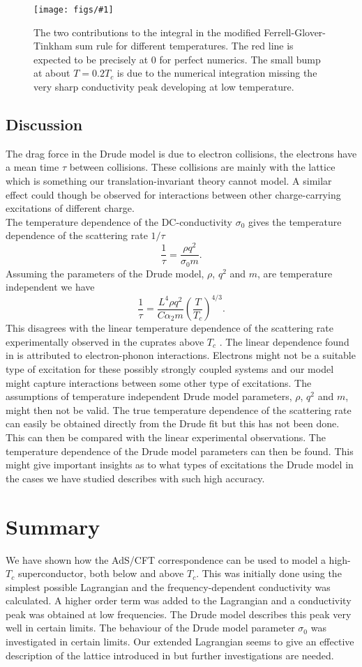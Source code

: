 \documentclass[12pt]{report}
\newcommand{\fig}[2]{
\begin{figure}
\centering
\texttt{[image: figs/\#1]}
\caption{#2}
\end{figure}
}
\begin{document}
\fig{sum_rule_a20.1}{The two contributions to the integral in the modified Ferrell-Glover-Tinkham sum rule for different temperatures. The red line is expected to be precisely at 0 for perfect numerics\label{f:sum2}. The small bump at about $T=0.2T_c$ is due to the numerical integration missing the very sharp conductivity peak developing at low temperature.}

\section{Discussion}
The drag force in the Drude model is due to electron collisions, the electrons have a mean time $\tau$ between collisions. These collisions are mainly with the lattice which is something our translation-invariant theory cannot model. A similar effect could though be observed for interactions between other charge-carrying excitations of different charge.\\
The temperature dependence of the DC-conductivity $\sigma_0$ gives the temperature dependence of the scattering rate $1/\tau$
\begin{equation}
  \frac{1}{\tau}=\frac{\rho q^2}{\sigma_0m}.
\end{equation}
Assuming the parameters of the Drude model, $\rho$, $q^2$ and $m$, are temperature independent we have
\begin{equation}
  \frac{1}{\tau}=\frac{L^4\rho q^2}{C\alpha_2m}\left(\frac{T}{T_c}\right)^{4/3}.
\end{equation}
This disagrees with the linear temperature dependence of the scattering rate experimentally observed in the cuprates above $T_c$ \cite{drudeFit}. The linear dependence found in \cite{drudeFit} is attributed to electron-phonon interactions. Electrons might not be a suitable type of excitation for these possibly strongly coupled systems and our model might capture interactions between some other type of excitations. The assumptions of temperature independent Drude model parameters, $\rho$, $q^2$ and $m$, might then not be valid. The true temperature dependence of the scattering rate can easily be obtained directly from the Drude fit but this has not been done. This can then be compared with the linear experimental observations. The temperature dependence of the Drude model parameters can then be found. This might give important insights as to what types of excitations the Drude model in the cases we have studied describes with such high accuracy.
\chapter{Summary}
We have shown how the AdS/CFT correspondence can be used to model a high-$T_c$ superconductor, both below and above $T_c$. This was initially done using the simplest possible Lagrangian and the frequency-dependent conductivity was calculated. A higher order term was added to the Lagrangian and a conductivity peak was obtained at low frequencies. The Drude model describes this peak very well in certain limits. The behaviour of the Drude model parameter $\sigma_0$ was investigated in certain limits. Our extended Lagrangian seems to give an effective description of the lattice introduced in \cite{horowitz} but further investigations are needed.
\end{document}
